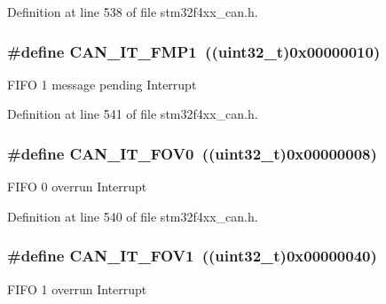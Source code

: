 Definition at line 538 of file stm32f4xx\-\_\-can.\-h.

\hypertarget{group___c_a_n__interrupts_gaa0e101053fb203629e0e9a954213e71e}{
\subsubsection[{C\-A\-N\-\_\-\-I\-T\-\_\-\-F\-M\-P1}]{\setlength{\rightskip}{0pt plus 5cm}\#define C\-A\-N\-\_\-\-I\-T\-\_\-\-F\-M\-P1~((uint32\-\_\-t)0x00000010)}}\label{group___c_a_n__interrupts_gaa0e101053fb203629e0e9a954213e71e}
F\-I\-F\-O 1 message pending Interrupt 

Definition at line 541 of file stm32f4xx\-\_\-can.\-h.

\hypertarget{group___c_a_n__interrupts_ga066a4317f95669e5b5931c9a759cf248}{
\subsubsection[{C\-A\-N\-\_\-\-I\-T\-\_\-\-F\-O\-V0}]{\setlength{\rightskip}{0pt plus 5cm}\#define C\-A\-N\-\_\-\-I\-T\-\_\-\-F\-O\-V0~((uint32\-\_\-t)0x00000008)}}\label{group___c_a_n__interrupts_ga066a4317f95669e5b5931c9a759cf248}
F\-I\-F\-O 0 overrun Interrupt 

Definition at line 540 of file stm32f4xx\-\_\-can.\-h.

\hypertarget{group___c_a_n__interrupts_ga963301fdbede5f9a9665dc5b6210eaec}{
\subsubsection[{C\-A\-N\-\_\-\-I\-T\-\_\-\-F\-O\-V1}]{\setlength{\rightskip}{0pt plus 5cm}\#define C\-A\-N\-\_\-\-I\-T\-\_\-\-F\-O\-V1~((uint32\-\_\-t)0x00000040)}}\label{group___c_a_n__interrupts_ga963301fdbede5f9a9665dc5b6210eaec}
F\-I\-F\-O 1 overrun Interrupt 


